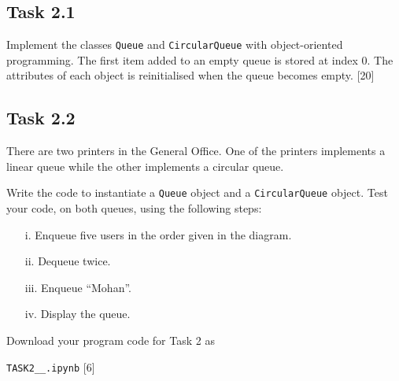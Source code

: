 \subsection*{Task 2.1}

Implement the classes \texttt{Queue} and \texttt{CircularQueue} with
object-oriented programming. The first item added to an empty queue
is stored at index 0. The attributes of each object is reinitialised
when the queue becomes empty.\hfill{} {[}20{]} 

\subsection*{Task 2.2 }

There are two printers in the General Office. One of the printers
implements a linear queue while the other implements a circular queue. 

Write the code to instantiate a \texttt{Queue} object and a \texttt{CircularQueue}
object. Test your code, on both queues, using the following steps: 
\begin{enumerate}
\item[i.]  Enqueue five users in the order given in the diagram. 
\item[ii.]  Dequeue twice.
\item[iii.]  Enqueue \textquotedblleft Mohan\textquotedblright .
\item[iv.]  Display the queue. 
\end{enumerate}
Download your program code for Task 2 as 

\texttt{TASK2\_<your class>\_<your name>.ipynb} \hfill{}{[}6{]}